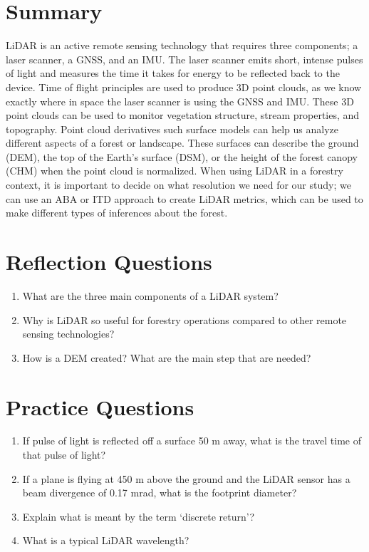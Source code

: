 \documentclass[
]{book}
\providecommand{\tightlist}{%
  \setlength{\itemsep}{0pt}\setlength{\parskip}{0pt}}
\begin{document}
\hypertarget{summary-12}{%
\section{Summary}\label{summary-12}}

LiDAR is an active remote sensing technology that requires three components; a laser scanner, a GNSS, and an IMU. The laser scanner emits short, intense pulses of light and measures the time it takes for energy to be reflected back to the device. Time of flight principles are used to produce 3D point clouds, as we know exactly where in space the laser scanner is using the GNSS and IMU. These 3D point clouds can be used to monitor vegetation structure, stream properties, and topography. Point cloud derivatives such surface models can help us analyze different aspects of a forest or landscape. These surfaces can describe the ground (DEM), the top of the Earth's surface (DSM), or the height of the forest canopy (CHM) when the point cloud is normalized. When using LiDAR in a forestry context, it is important to decide on what resolution we need for our study; we can use an ABA or ITD approach to create LiDAR metrics, which can be used to make different types of inferences about the forest.

\hypertarget{reflection-questions-11}{%
\section*{Reflection Questions}\label{reflection-questions-11}}

\begin{enumerate}
\def\labelenumi{\arabic{enumi}.}
\tightlist
\item
  What are the three main components of a LiDAR system?
\item
  Why is LiDAR so useful for forestry operations compared to other remote sensing technologies?
\item
  How is a DEM created? What are the main step that are needed?
\end{enumerate}

\hypertarget{practice-questions-8}{%
\section*{Practice Questions}\label{practice-questions-8}}

\begin{enumerate}
\def\labelenumi{\arabic{enumi}.}
\tightlist
\item
  If pulse of light is reflected off a surface 50 m away, what is the travel time of that pulse of light?
\item
  If a plane is flying at 450 m above the ground and the LiDAR sensor has a beam divergence of 0.17 mrad, what is the footprint diameter?
\item
  Explain what is meant by the term `discrete return'?
\item
  What is a typical LiDAR wavelength?
\end{enumerate}
\end{document}
